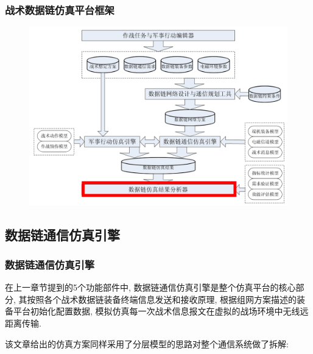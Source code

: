 \documentclass[10pt,mathserif]{beamer}%
\begin{document}
\begin{frame}[fragile]
	\frametitle{战术数据链仿真平台框架}
	\setlength{\parindent}{2em}
	\begin{spacing}{1.5}
		\begin{figure}[htb]
			\centering
			\includegraphics[width=1\linewidth]{./images/arch5.png}
		\end{figure}
	\end{spacing}
\end{frame}

\subsection{数据链通信仿真引擎}
\begin{frame}[fragile]
	\frametitle{数据链通信仿真引擎}
	\setlength{\parindent}{2em}
	\begin{spacing}{1.5}
		在上一章节提到的5个功能部件中, 数据链通信仿真引擎是整个仿真平台的核心部
		分, 其按照各个战术数据链装备终端信息发送和接收原理, 根据组网方案描述的装
		备平台初始化配置数据, 模拟仿真每一次战术信息报文在虚拟的战场环境中无线远
		距离传输. 

		该文章给出的仿真方案同样采用了分层模型的思路对整个通信系统做了拆解:
	\end{spacing}
\end{frame}
\end{document}
